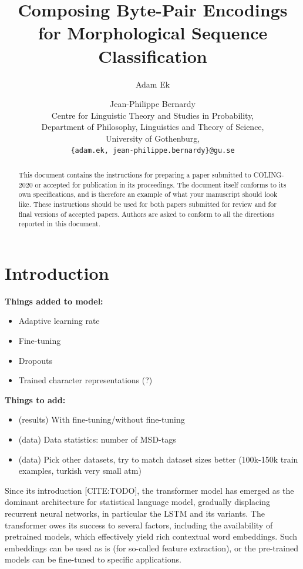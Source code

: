 \documentclass[11pt]{article}
\title{Composing Byte-Pair Encodings for Morphological Sequence Classification}
\author{Adam Ek \and Jean-Philippe Bernardy\\
	Centre for Linguistic Theory and Studies in Probability,\\
	Department of Philosophy, Linguistics and Theory of Science,\\
	University of Gothenburg,\\
	\texttt{\{adam.ek, jean-philippe.bernardy\}@gu.se}}
\date{}
\begin{document}
	\maketitle
	
	\begin{abstract}
		This document contains the instructions for preparing a paper submitted
		to COLING-2020 or accepted for publication in its proceedings. The document itself
		conforms to its own specifications, and is therefore an example of
		what your manuscript should look like. These instructions should be
		used for both papers submitted for review and for final versions of
		accepted papers. Authors are asked to conform to all the directions
		reported in this document.
	\end{abstract}
	
	\section{Introduction}
	\label{intro}
	
	\textbf{Things added to model:}
	\begin{itemize}
		\item Adaptive learning rate
		\item Fine-tuning
		\item Dropouts
		\item Trained character representations (?)
	\end{itemize}
	
	\textbf{Things to add:}
	\begin{itemize}
		\item (results) With fine-tuning/without fine-tuning
		\item (data) Data statistics: number of MSD-tags 
		\item (data) Pick other datasets, try to match dataset sizes better (100k-150k train examples, turkish very small atm)
	\end{itemize}

            Since its introduction [CITE:TODO], the transformer model
     \citep{vaswani2017attention} has emerged as the dominant
     architecture for statistical language model, gradually displacing
     recurrent neural networks, in particular the LSTM and its
     variants. The transformer owes its success to several factors,
     including the availability of pretrained models, which
     effectively yield rich contextual word embeddings. Such
     embeddings can be used as is (for so-called feature extraction),
     or the pre-trained models can be fine-tuned to specific
     applications.
\end{document}
